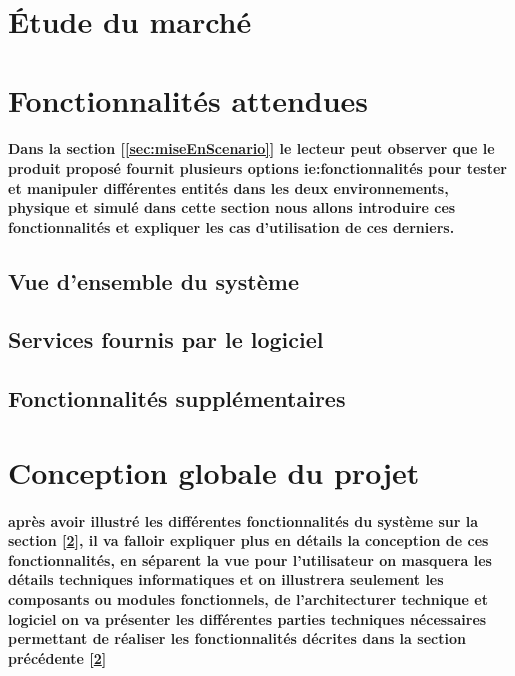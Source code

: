 \section{Étude du marché} \label{sec:etudeMarche}
\paragraph{}



\section{Fonctionnalités attendues} \label{sec:foncAttendues}
\paragraph{Dans la section [\ref{sec:miseEnScenario}] le lecteur peut observer que le produit proposé fournit plusieurs options ie:fonctionnalités pour tester et manipuler différentes entités dans les deux environnements, physique et simulé dans cette section nous allons introduire ces fonctionnalités et expliquer les cas d'utilisation de ces derniers.}

\subsection{Vue d’ensemble du système} \label{subsec:vueEns}

\subsection{Services fournis par le logiciel} \label{subsec:serLogiciel}

\subsection{Fonctionnalités supplémentaires} \label{subsec:foncSupplementaires}



\section{Conception globale du projet} \label{sec:conception}
\paragraph{après avoir illustré les différentes fonctionnalités du système sur la section [\ref{sec:foncAttendues}], il va falloir expliquer plus en détails la conception de ces fonctionnalités, en séparent la vue pour l'utilisateur on masquera les détails techniques informatiques et on illustrera seulement les composants ou modules fonctionnels, de l'architecturer technique et logiciel on va présenter les différentes parties techniques nécessaires permettant de réaliser les fonctionnalités décrites dans la section précédente [\ref{sec:foncAttendues}]}

